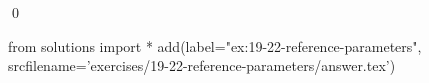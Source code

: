 
\begin{ex}
  \label{ex:19-22-reference-parameters}
  
  \qed
\end{ex}
\begin{python0}
from solutions import *
add(label="ex:19-22-reference-parameters",
    srcfilename='exercises/19-22-reference-parameters/answer.tex')
\end{python0}
